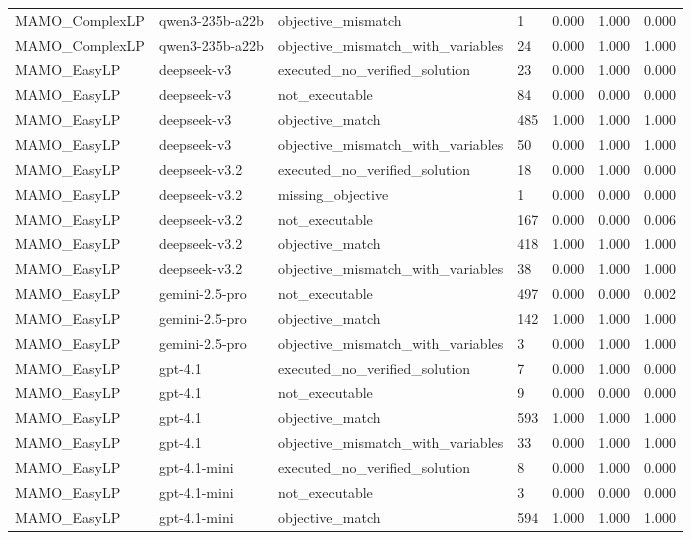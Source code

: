 \begin{table}[t]
\begin{tabular}{lllllll}
MAMO\_ComplexLP & qwen3-235b-a22b & objective\_mismatch & 1 & 0.000 & 1.000 & 0.000 \\
MAMO\_ComplexLP & qwen3-235b-a22b & objective\_mismatch\_with\_variables & 24 & 0.000 & 1.000 & 1.000 \\
MAMO\_EasyLP & deepseek-v3 & executed\_no\_verified\_solution & 23 & 0.000 & 1.000 & 0.000 \\
MAMO\_EasyLP & deepseek-v3 & not\_executable & 84 & 0.000 & 0.000 & 0.000 \\
MAMO\_EasyLP & deepseek-v3 & objective\_match & 485 & 1.000 & 1.000 & 1.000 \\
MAMO\_EasyLP & deepseek-v3 & objective\_mismatch\_with\_variables & 50 & 0.000 & 1.000 & 1.000 \\
MAMO\_EasyLP & deepseek-v3.2 & executed\_no\_verified\_solution & 18 & 0.000 & 1.000 & 0.000 \\
MAMO\_EasyLP & deepseek-v3.2 & missing\_objective & 1 & 0.000 & 0.000 & 0.000 \\
MAMO\_EasyLP & deepseek-v3.2 & not\_executable & 167 & 0.000 & 0.000 & 0.006 \\
MAMO\_EasyLP & deepseek-v3.2 & objective\_match & 418 & 1.000 & 1.000 & 1.000 \\
MAMO\_EasyLP & deepseek-v3.2 & objective\_mismatch\_with\_variables & 38 & 0.000 & 1.000 & 1.000 \\
MAMO\_EasyLP & gemini-2.5-pro & not\_executable & 497 & 0.000 & 0.000 & 0.002 \\
MAMO\_EasyLP & gemini-2.5-pro & objective\_match & 142 & 1.000 & 1.000 & 1.000 \\
MAMO\_EasyLP & gemini-2.5-pro & objective\_mismatch\_with\_variables & 3 & 0.000 & 1.000 & 1.000 \\
MAMO\_EasyLP & gpt-4.1 & executed\_no\_verified\_solution & 7 & 0.000 & 1.000 & 0.000 \\
MAMO\_EasyLP & gpt-4.1 & not\_executable & 9 & 0.000 & 0.000 & 0.000 \\
MAMO\_EasyLP & gpt-4.1 & objective\_match & 593 & 1.000 & 1.000 & 1.000 \\
MAMO\_EasyLP & gpt-4.1 & objective\_mismatch\_with\_variables & 33 & 0.000 & 1.000 & 1.000 \\
MAMO\_EasyLP & gpt-4.1-mini & executed\_no\_verified\_solution & 8 & 0.000 & 1.000 & 0.000 \\
MAMO\_EasyLP & gpt-4.1-mini & not\_executable & 3 & 0.000 & 0.000 & 0.000 \\
MAMO\_EasyLP & gpt-4.1-mini & objective\_match & 594 & 1.000 & 1.000 & 1.000 \\

\end{tabular}
\end{table}
